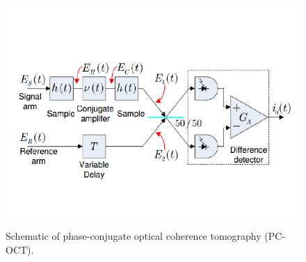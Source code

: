 \begin{figure}[t]
\begin{center}
\includegraphics[width=13cm]{figure-pcoct-schematic-pcoct.pdf}
\caption{Schematic of phase-conjugate optical coherence tomography (PC-OCT).}
\label{figure:pcoct-schematic-pcoct}
\end{center}
\end{figure}

